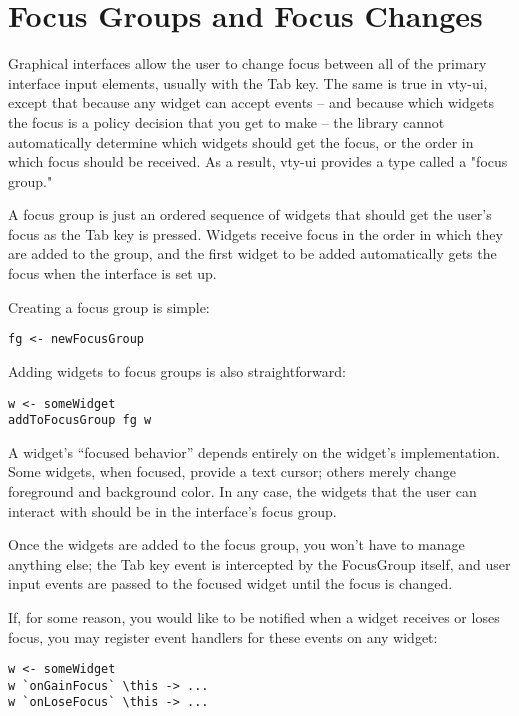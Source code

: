 \section{Focus Groups and Focus Changes}
\label{sec:focus}

Graphical interfaces allow the user to change focus between all of the
primary interface input elements, usually with the Tab key.  The same is
true in vty-ui, except that because any widget can accept events -- and
because which widgets the focus is a policy decision that you get to
make -- the library cannot automatically determine which widgets should
get the focus, or the order in which focus should be received.  As a
result, vty-ui provides a type called a "focus group."

A focus group is just an ordered sequence of widgets that should get the
user's focus as the Tab key is pressed.  Widgets receive focus in the
order in which they are added to the group, and the first widget to be
added automatically gets the focus when the interface is set up.

Creating a focus group is simple:

\begin{verbatim}
fg <- newFocusGroup
\end{verbatim}

Adding widgets to focus groups is also straightforward:

\begin{verbatim}
w <- someWidget
addToFocusGroup fg w
\end{verbatim}

A widget's ``focused behavior'' depends entirely on the widget's
implementation.  Some widgets, when focused, provide a text cursor;
others merely change foreground and background color.  In any case,
the widgets that the user can interact with should be in the
interface's focus group.

Once the widgets are added to the focus group, you won't have to manage
anything else; the Tab key event is intercepted by the FocusGroup
itself, and user input events are passed to the focused widget until the
focus is changed.

If, for some reason, you would like to be notified when a widget
receives or loses focus, you may register event handlers for these
events on any widget:

\begin{verbatim}
w <- someWidget
w `onGainFocus` \this -> ...
w `onLoseFocus` \this -> ...
\end{verbatim}

